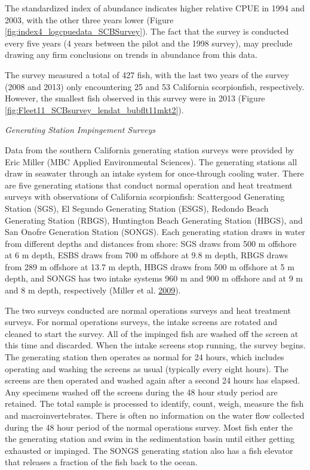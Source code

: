 \documentclass[12pt,]{article}
\begin{document}
The standardized index of abundance indicates higher relative CPUE in
1994 and 2003, with the other three years lower (Figure
\ref{fig:index4_logcpuedata_SCBSurvey}). The fact that the survey is
conducted every five years (4 years between the pilot and the 1998
survey), may preclude drawing any firm conclusions on trends in
abundance from this data.

The survey measured a total of 427 fish, with the last two years of the
survey (2008 and 2013) only encountering 25 and 53 California
scorpionfish, respectively.\\
However, the smallest fish observed in this survey were in 2013 (Figure
\ref{fig:Fleet11_SCBsurvey_lendat_bubflt11mkt2}).

\emph{Generating Station Impingement Surveys}

Data from the southern California generating station surveys were
provided by Eric Miller (MBC Applied Environmental Sciences). The
generating stations all draw in seawater through an intake system for
once-through cooling water. There are five generating stations that
conduct normal operation and heat treatment surveys with observations of
California scorpionfish: Scattergood Generating Station (SGS), El
Segundo Generating Station (ESGS), Redondo Beach Generating Station
(RBGS), Huntington Beach Generating Station (HBGS), and San Onofre
Generation Station (SONGS). Each generating station draws in water from
different depths and distances from shore: SGS draws from 500 m offshore
at 6 m depth, ESBS draws from 700 m offshore at 9.8 m depth, RBGS draws
from 289 m offshore at 13.7 m depth, HBGS draws from 500 m offshore at 5
m depth, and SONGS has two intake systems 960 m and 900 m offshore and
at 9 m and 8 m depth, respectively (Miller et al.
\protect\hyperlink{ref-Miller2009}{2009}).

The two surveys conducted are normal operations surveys and heat
treatment surveys. For normal operations surveys, the intake screens are
rotated and cleaned to start the survey. All of the impinged fish are
washed off the screen at this time and discarded. When the intake
screens stop running, the survey begins. The generating station then
operates as normal for 24 hours, which includes operating and washing
the screens as usual (typically every eight hours). The screens are then
operated and washed again after a second 24 hours has elapsed. Any
specimens washed off the screens during the 48 hour study period are
retained. The total sample is processed to identify, count, weigh,
measure the fish and macroinvertebrates. There is often no information
on the water flow collected during the 48 hour period of the normal
operations survey. Most fish enter the the generating station and swim
in the sedimentation basin until either getting exhausted or impinged.
The SONGS generating station also has a fish elevator that releases a
fraction of the fish back to the ocean.
\end{document}

